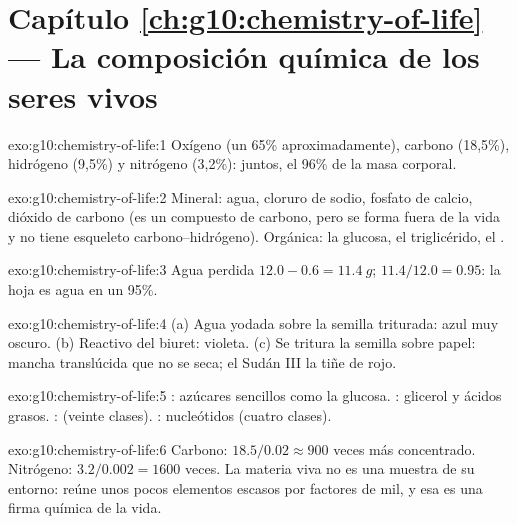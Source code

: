 \section*{Capítulo \ref{ch:g10:chemistry-of-life} --- La composición química de los seres vivos}

\begin{solution}{exo:g10:chemistry-of-life:1}
Oxígeno (un 65\% aproximadamente), carbono (18,5\%), hidrógeno (9,5\%)
y nitrógeno (3,2\%): juntos, el 96\% de la masa corporal.
\end{solution}

\begin{solution}{exo:g10:chemistry-of-life:2}
Mineral: agua, cloruro de sodio, fosfato de calcio, dióxido de carbono
(es un compuesto de carbono, pero se forma fuera de la vida y no tiene
esqueleto carbono--hidrógeno). Orgánica: la glucosa, el triglicérido,
el .
\end{solution}

\begin{solution}{exo:g10:chemistry-of-life:3}
Agua perdida $12.0 - 0.6 = \qty{11.4}{g}$; $11.4/12.0 = 0.95$: la hoja
es agua en un 95\%.
\end{solution}

\begin{solution}{exo:g10:chemistry-of-life:4}
(a) Agua yodada sobre la semilla triturada: azul muy oscuro. (b)
Reactivo del biuret: violeta. (c) Se tritura la semilla sobre papel:
mancha translúcida que no se seca; el Sudán III la tiñe de rojo.
\end{solution}

\begin{solution}{exo:g10:chemistry-of-life:5}
: azúcares sencillos como la glucosa. : glicerol y
ácidos grasos. :  (veinte clases). : nucleótidos (cuatro clases).
\end{solution}

\begin{solution}{exo:g10:chemistry-of-life:6}
Carbono: $18.5/0.02 \approx 900$ veces más concentrado. Nitrógeno:
$3.2/0.002 = 1600$ veces. La materia viva no es una muestra de su
entorno: reúne unos pocos elementos escasos por factores de mil, y esa
es una firma química de la vida.
\end{solution}

